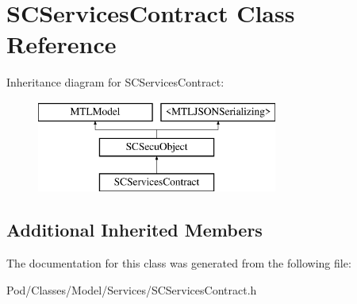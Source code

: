 \hypertarget{interface_s_c_services_contract}{}\section{S\+C\+Services\+Contract Class Reference}
\label{interface_s_c_services_contract}
Inheritance diagram for S\+C\+Services\+Contract\+:\begin{figure}[H]
\begin{center}
\leavevmode
\includegraphics[height=3.000000cm]{interface_s_c_services_contract}
\end{center}
\end{figure}
\subsection*{Additional Inherited Members}


The documentation for this class was generated from the following file\+:\begin{DoxyCompactItemize}
\item 
Pod/\+Classes/\+Model/\+Services/S\+C\+Services\+Contract.\+h\end{DoxyCompactItemize}
